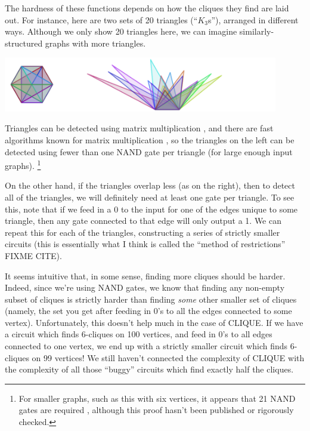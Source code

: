 \documentclass[12pt]{article}
\theoremstyle{definition}
\begin{document}
The hardness of these functions depends
on how the cliques they find are laid out.
For instance, here are two sets of 20 triangles (``$K_3$s''),
arranged in different ways. Although we only show 20 triangles here,
we can imagine similarly-structured graphs with more triangles.

\includegraphics[width=0.9\textwidth]{R/tri1.pdf}



Triangles can be detected using matrix multiplication \cite{itai_finding_1977},
and there are fast algorithms known for matrix multiplication
\cite{strassen_gaussian_1969}
\cite{williams_multiplying_2012}, so
the triangles on the left can be detected
using fewer than one NAND gate per triangle (for large enough input graphs).
\footnote{For smaller graphs, such as this with six vertices,
it appears that 21 NAND gates are required
\cite{burdick_triangles_6_vertex},
although this proof hasn't been published or rigorously checked.}

On the other hand, if the triangles overlap less (as on the right),
then to detect all of the triangles, we will definitely need at least one
gate per triangle.
To see this, note that if we feed in a 0 to the input for one
of the edges unique to some triangle, then any gate connected to
that edge will only output a 1. We can repeat this for each of the
triangles, constructing a series of strictly smaller circuits
(this is essentially what I think is called
the ``method of restrictions'' FIXME CITE).

It seems intuitive that, in some sense, finding more cliques should
be harder.
Indeed, since we're using NAND gates, we know that finding any non-empty
subset of cliques is strictly harder than finding {\em some} other 
smaller set of cliques (namely, the set you get after feeding in 0's to
all the edges connected to some vertex).
Unfortunately, this doesn't help much
in the case of CLIQUE.  If we have a circuit which
finds 6-cliques on 100 vertices, and feed in 0's to all edges connected to
one vertex, we
end up with a strictly smaller circuit which finds 6-cliques on
99 vertices! We still haven't connected the complexity of CLIQUE with
the complexity of all those ``buggy'' circuits which find exactly half
the cliques.
\end{document}
